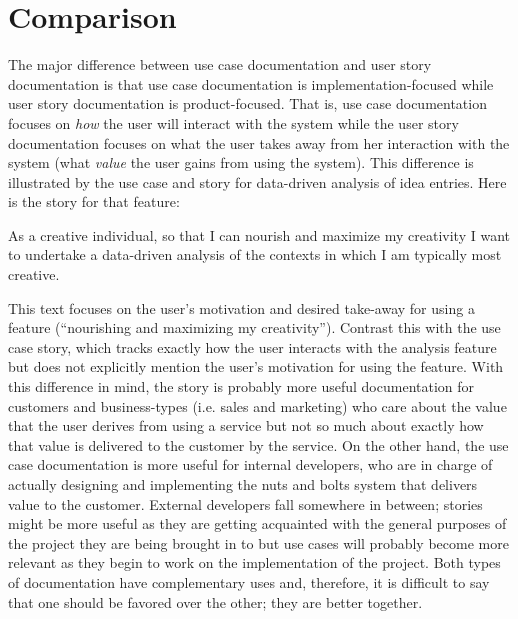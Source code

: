 \documentclass[a4paper]{article}
\begin{document}
\section{Comparison}
The major difference between use case documentation and user story documentation is that use case documentation is implementation-focused while user story documentation is product-focused. That is, use case documentation focuses on \textit{how} the user will interact with the system while the user story documentation focuses on what the user takes away from her interaction with the system (what \textit{value} the user gains from using the system). This difference is illustrated by the use case and story for data-driven analysis of idea entries. Here is the story for that feature:
\begin{displayquote}
As a creative individual, so that I can nourish and maximize my creativity I want to undertake a data-driven analysis of the contexts in which I am typically most creative.
\end{displayquote}
This text focuses on the user's motivation and desired take-away for using a feature (``nourishing and maximizing my creativity''). Contrast this with the use case story, which tracks exactly how the user interacts with the analysis feature but does not explicitly mention the user's motivation for using the feature.
With this difference in mind, the story is probably more useful documentation for customers and business-types (i.e. sales and marketing) who care about the value that the user derives from using a service but not so much about exactly how that value is delivered to the customer by the service. On the other hand, the use case documentation is more useful for internal developers, who are in charge of actually designing and implementing the nuts and bolts system that delivers value to the customer. External developers fall somewhere in between; stories might be more useful as they are getting acquainted with the general purposes of the project they are being brought in to but use cases will probably become more relevant as they begin to work on the implementation of the project. Both types of documentation have complementary uses and, therefore, it is difficult to say that one should be favored over the other; they are better together.
\end{document}
